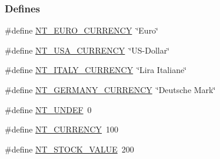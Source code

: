 \subsubsection*{Defines}
\begin{DoxyCompactItemize}
\item 
\#define \hyperlink{nt__codes_8h_a6d5e2fad48ddeb219bba1408d64adaea}{NT\_\-EURO\_\-CURRENCY}~\char`\"{}Euro\char`\"{}
\item 
\#define \hyperlink{nt__codes_8h_a0ac0de99dc06963ab0e7322ba742f3bf}{NT\_\-USA\_\-CURRENCY}~\char`\"{}US-\/Dollar\char`\"{}
\item 
\#define \hyperlink{nt__codes_8h_a68a6a4456958fac0c70bc9079674da5e}{NT\_\-ITALY\_\-CURRENCY}~\char`\"{}Lira Italiane\char`\"{}
\item 
\#define \hyperlink{nt__codes_8h_a87369c0fbc97c77497ffbfcaeac5746d}{NT\_\-GERMANY\_\-CURRENCY}~\char`\"{}Deutsche Mark\char`\"{}
\item 
\#define \hyperlink{nt__codes_8h_a9971dbdfd7fc0cd3f06f161c386ea5d2}{NT\_\-UNDEF}~0
\item 
\#define \hyperlink{nt__codes_8h_a1e3696a3f77a75a2142222c0345e6d0c}{NT\_\-CURRENCY}~100
\item 
\#define \hyperlink{nt__codes_8h_a28bdb1d8795df5a7cb247ec936fb585e}{NT\_\-STOCK\_\-VALUE}~200
\end{DoxyCompactItemize}
